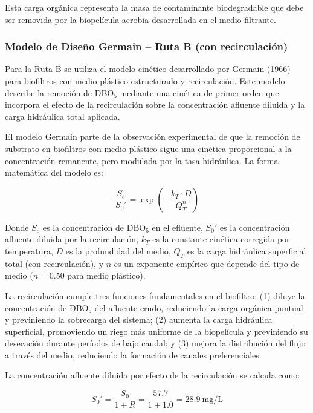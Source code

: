 \documentclass[12pt,a4paper]{article}
\begin{document}
Esta carga orgánica representa la masa de contaminante biodegradable que debe ser removida por la biopelícula aerobia desarrollada en el medio filtrante.

\subsubsection*{Modelo de Diseño Germain -- Ruta B (con recirculación)}

Para la Ruta B se utiliza el modelo cinético desarrollado por Germain (1966) para biofiltros con medio plástico estructurado y recirculación. Este modelo describe la remoción de DBO$_5$ mediante una cinética de primer orden que incorpora el efecto de la recirculación sobre la concentración afluente diluida y la carga hidráulica total aplicada.

El modelo Germain parte de la observación experimental de que la remoción de substrato en biofiltros con medio plástico sigue una cinética proporcional a la concentración remanente, pero modulada por la tasa hidráulica. La forma matemática del modelo es:

\begin{equation}
\frac{S_e}{S_0'} = \exp\!\left(-\frac{k_T \cdot D}{Q_T^n}\right)
\end{equation}

Donde $S_e$ es la concentración de DBO$_5$ en el efluente, $S_0'$ es la concentración afluente diluida por la recirculación, $k_T$ es la constante cinética corregida por temperatura, $D$ es la profundidad del medio, $Q_T$ es la carga hidráulica superficial total (con recirculación), y $n$ es un exponente empírico que depende del tipo de medio ($n = 0.50$ para medio plástico).

La recirculación cumple tres funciones fundamentales en el biofiltro: (1) diluye la concentración de DBO$_5$ del afluente crudo, reduciendo la carga orgánica puntual y previniendo la sobrecarga del sistema; (2) aumenta la carga hidráulica superficial, promoviendo un riego más uniforme de la biopelícula y previniendo su desecación durante períodos de bajo caudal; y (3) mejora la distribución del flujo a través del medio, reduciendo la formación de canales preferenciales.

La concentración afluente diluida por efecto de la recirculación se calcula como:

\begin{equation}
S_0' = \frac{S_0}{1 + R} = \frac{57.7}{1 + 1.0} = 28.9\ \text{mg/L}
\end{equation}
\end{document}

